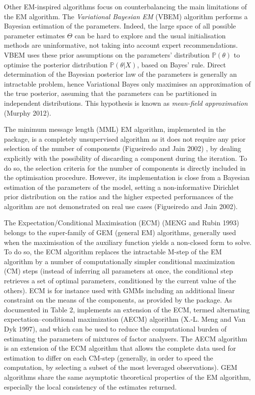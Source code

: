 Other EM-inspired algorithms focus on counterbalancing the main
limitations of the EM algorithm. The \emph{Variational Bayesian EM} (VBEM)
algorithm performs a Bayesian estimation of the parameters. Indeed, the
large space of all possible parameter estimates \(\Theta\) can be hard to
explore and the usual initialisation methods are uninformative, not
taking into account expert recommendations. VBEM uses these prior
assumptions on the parameters' distribution \(\mathbb{P} (\theta)\) to
optimise the posterior distribution \(\mathbb{P} (\theta|X)\), based on
Bayes' rule. Direct determination of the Bayesian posterior law of the
parameters is generally an intractable problem, hence Variational Bayes
only maximises an approximation of the true posterior, assuming that the
parameters can be partitioned in independent distributions. This
hypothesis is known as \emph{mean-field approximation} (Murphy 2012).

The minimum message length (MML) EM algorithm, implemented in the
 package, is a completely unsupervised algorithm as it
does not require any prior selection of the number of components
(Figueiredo and Jain 2002) , by dealing explicitly with the possibility of
discarding a component during the iteration. To do so, the selection
criteria for the number of components is directly included in the
optimisation procedure. However, its implementation is close from a
Bayesian estimation of the parameters of the model, setting a
non-informative Dirichlet prior distribution on the ratios and the
higher expected performances of the algorithm are not demonstrated on
real use cases (Figueiredo and Jain 2002).

The Expectation/Conditional Maximisation (ECM) (MENG and Rubin 1993) belongs to the super-family of GEM (general EM) algorithms, generally used when the maximisation of the auxiliary function yields a non-closed form to solve. To do so, the ECM algorithm replaces the intractable M-step of the EM algorithm by a number of computationally simpler conditional maximization (CM) steps (instead of inferring all parameters at once, the conditional step retrieves a set of optimal parameters, conditioned by the current value of the others). ECM is for instance used with GMMs including an additional linear constraint on the means of the components, as provided by the 
package. As documented in Table 2,  implements an extension of the ECM, termed alternating expectation--conditional maximization (AECM) algorithm (X.-L. Meng and Van Dyk 1997), and which can be used to reduce the computational burden of estimating the parameters of mixtures of factor analysers. The AECM algorithm is an extension of the ECM algorithm that allows the complete data used for estimation to differ on each CM-step (generally, in order to speed the computation, by selecting a subset of the most leveraged observations). GEM algorithms share the same asymptotic theoretical properties of the EM algorithm, especially the local consistency of the estimates returned.

